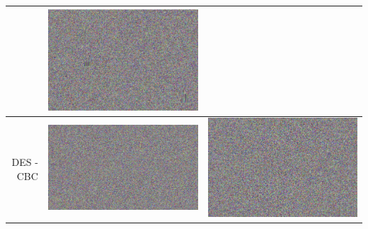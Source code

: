 \documentclass[fleqn, journal, onecolumn]{IEEEtran}             %
\theoremstyle{break}                                            %
\begin{document}
\begin{tabular}{|r || p{5cm} | p{5cm} | }
\begin{minipage}{.2\textwidth}
      \end{minipage}  & 
      \begin{minipage}{.2\textwidth}
        \includegraphics[width=\linewidth]{2DES1}
      \end{minipage}    
      \\\hline
      DES - CBC  &  
      \begin{minipage}{.2\textwidth}
        \includegraphics[width=\linewidth]{1DES2}
      \end{minipage}  & 
      \begin{minipage}{.2\textwidth}
        \includegraphics[width=\linewidth]{2DES2}

\end{minipage}
\end{tabular}
\end{document}
